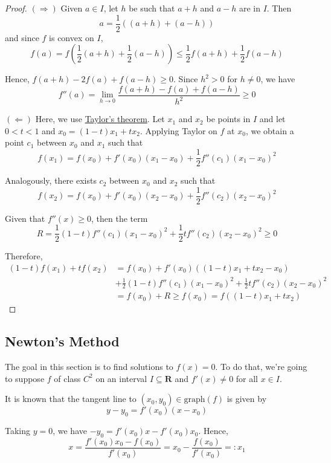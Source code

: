 \documentclass[tikz,12pt,a4paper]{article}
\theoremstyle{definition}
\begin{document}
\begin{proof}
	$(\Rightarrow)$ Given $a \in I$, let $h$ be such that $a+h$ and $a-h$ are in $I$. Then
	\[
		a = \frac{1}{2} ((a+h) + (a-h))
	\]
	and since $f$ is convex on $I$, 
	\[
		f(a) = f \left( \frac{1}{2} (a+h) + \frac{1}{2}(a-h) \right) \leq \frac{1}{2} f(a+h) + \frac{1}{2} f(a-h)
	\]

	Hence, $f(a+h) - 2f(a) + f(a-h) \geq 0$. Since $h^2 > 0$ for $h \neq 0$, we have 
	\[
		f''(a) = \lim_{h \to 0} \frac{f(a+h) - f(a) + f(a-h)}{h^2} \geq 0
	\]

	$(\Leftarrow)$ Here, we use \hyperref[thm:taylor]{Taylor's theorem}. Let $x_1$ and $x_2$ be points in $I$ and let $0 < t < 1$ and $x_0 = (1-t) x_1 + t x_2$. Applying Taylor on $f$ at $x_0$, we obtain a point $c_1$ between $x_0$ and $x_1$ such that
	\[
		f(x_1) = f(x_0) + f'(x_0)(x_1 - x_0) + \frac{1}{2} f''(c_1)(x_1 - x_0)^2
	\]

	Analogously, there exists $c_2$ between $x_0$ and $x_2$ such that
	\[
		f(x_2) = f(x_0) + f'(x_0)(x_2 - x_0) + \frac{1}{2} f''(c_2)(x_2 - x_0)^2
	\]

	Given that $f''(x) \geq 0$, then the term
	\[
		R = \frac{1}{2}(1-t)f''(c_1)(x_1 - x_0)^2 + \frac{1}{2}t f''(c_2)(x_2 - x_0)^2 \geq 0
	\]

	Therefore,
	\begin{equation*}
		\begin{aligned}
			(1-t)f(x_1) + tf(x_2) &= f(x_0) + f'(x_0)((1-t)x_1 + tx_2 - x_0) \\
			&+ \frac{1}{2}(1-t)f''(c_1) (x_1 - x_0)^2 + \frac{1}{2}t f''(c_2)(x_2 - x_0)^2 \\
			&= f(x_0) + R \geq f(x_0) = f((1-t)x_1 + t x_2)
		\end{aligned}
	\end{equation*}
\end{proof}

\subsection{Newton's Method}

The goal in this section is to find solutions to $f(x) = 0$. To do that, we're going to suppose $f$ of class $C^2$ on an interval $I \subseteq \textbf{R}$ and $f'(x) \neq 0$ for all $x \in I$.

It is known that the tangent line to $(x_0, y_0) \in \text{graph}(f)$ is given by
\[
	y - y_0 = f'(x_0)(x - x_0)	
\]

Taking $y = 0$, we have $-y_0 = f'(x_0) x - f'(x_0) x_0$. Hence,
\[
	x = \frac{f'(x_0) x_0 - f(x_0)}{f'(x_0)} = x_0 - \frac{f(x_0)}{f'(x_0)} =: x_1
\]
\end{document}
